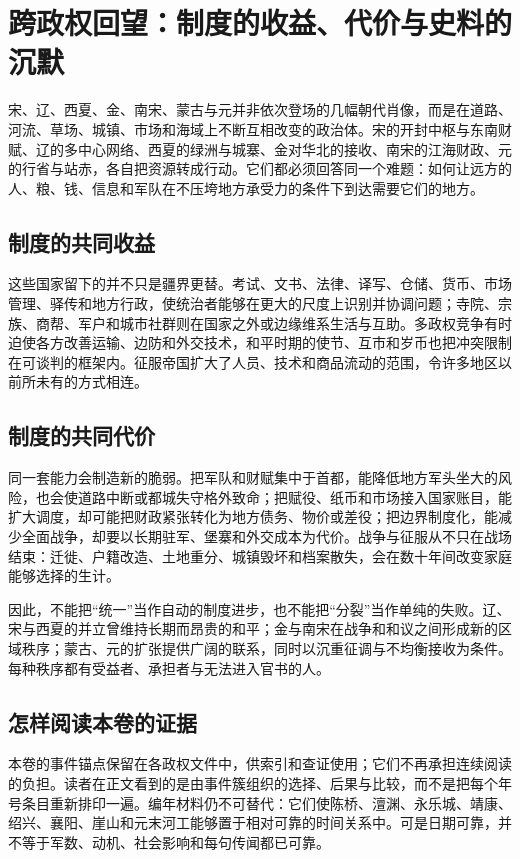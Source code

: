 \section{跨政权回望：制度的收益、代价与史料的沉默}

宋、辽、西夏、金、南宋、蒙古与元并非依次登场的几幅朝代肖像，而是在道路、河流、草场、城镇、市场和海域上不断互相改变的政治体。宋的开封中枢与东南财赋、辽的多中心网络、西夏的绿洲与城寨、金对华北的接收、南宋的江海财政、元的行省与站赤，各自把资源转成行动。它们都必须回答同一个难题：如何让远方的人、粮、钱、信息和军队在不压垮地方承受力的条件下到达需要它们的地方。

\subsection{制度的共同收益}

这些国家留下的并不只是疆界更替。考试、文书、法律、译写、仓储、货币、市场管理、驿传和地方行政，使统治者能够在更大的尺度上识别并协调问题；寺院、宗族、商帮、军户和城市社群则在国家之外或边缘维系生活与互助。多政权竞争有时迫使各方改善运输、边防和外交技术，和平时期的使节、互市和岁币也把冲突限制在可谈判的框架内。征服帝国扩大了人员、技术和商品流动的范围，令许多地区以前所未有的方式相连。

\subsection{制度的共同代价}

同一套能力会制造新的脆弱。把军队和财赋集中于首都，能降低地方军头坐大的风险，也会使道路中断或都城失守格外致命；把赋役、纸币和市场接入国家账目，能扩大调度，却可能把财政紧张转化为地方债务、物价或差役；把边界制度化，能减少全面战争，却要以长期驻军、堡寨和外交成本为代价。战争与征服从不只在战场结束：迁徙、户籍改造、土地重分、城镇毁坏和档案散失，会在数十年间改变家庭能够选择的生计。

因此，不能把“统一”当作自动的制度进步，也不能把“分裂”当作单纯的失败。辽、宋与西夏的并立曾维持长期而昂贵的和平；金与南宋在战争和和议之间形成新的区域秩序；蒙古、元的扩张提供广阔的联系，同时以沉重征调与不均衡接收为条件。每种秩序都有受益者、承担者与无法进入官书的人。

\subsection{怎样阅读本卷的证据}

本卷的事件锚点保留在各政权文件中，供索引和查证使用；它们不再承担连续阅读的负担。读者在正文看到的是由事件簇组织的选择、后果与比较，而不是把每个年号条目重新排印一遍。编年材料仍不可替代：它们使陈桥、澶渊、永乐城、靖康、绍兴、襄阳、崖山和元末河工能够置于相对可靠的时间关系中。可是日期可靠，并不等于军数、动机、社会影响和每句传闻都已可靠。

